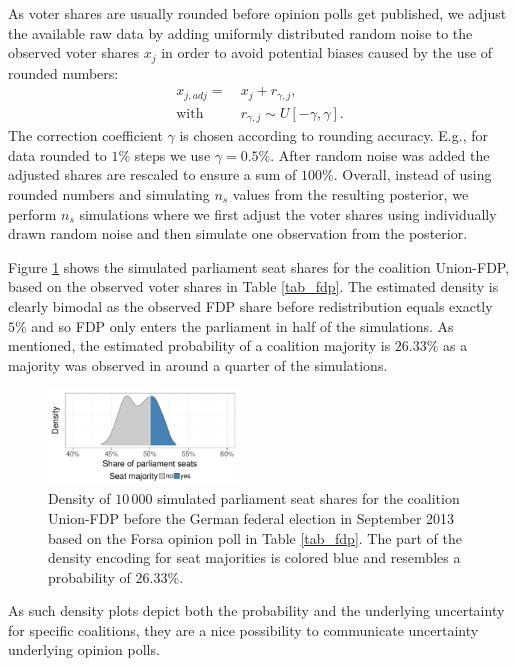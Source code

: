 \documentclass[smallcondensed]{svjour3}     %
\begin{document}
As voter shares are usually rounded before opinion polls get published,
we adjust the available raw data
by adding uniformly distributed random noise to the
observed voter shares $x_j$ in order to avoid potential biases caused 
by the use of rounded numbers:
\begin{equation}
\begin{aligned}
x_{j,adj} = \ &x_j + r_{\gamma,j}, \\
\text{with} \ \ \ \ \ &r_{\gamma,j} \sim U[-\gamma,\gamma].
\end{aligned}
\end{equation}
The correction coefficient $\gamma$ is chosen according to
rounding accuracy.
E.g., for data rounded to $1\%$ steps we use $\gamma = 0.5\%$.
After random noise was added the adjusted shares are rescaled to
ensure a sum of $100\%$. Overall, instead of using rounded numbers
and simulating $n_s$ values from the resulting posterior, we perform 
$n_s$ simulations where
we first adjust the voter shares using individually drawn random noise
and then simulate one observation from the posterior.


Figure \ref{fig:seatDist} shows the simulated
parliament seat shares for the coalition Union-FDP, based on the observed
voter shares in Table \ref{tab_fdp}. The estimated density is clearly bimodal
as the observed FDP share before redistribution equals exactly $5\%$ and
so FDP only enters the parliament in half of the simulations. As mentioned,
the estimated probability of a coalition majority is $26.33\%$ as
a majority was observed in around a quarter of the simulations.

\begin{figure}[H]\centering
\includegraphics[width=0.45\textwidth]{figures/2013_forsa_cdufdp_lastPreelectionPoll.pdf}
\caption{Density of $10\,000$ simulated parliament seat shares for the coalition Union-FDP before the German federal election in September 2013 based on the Forsa opinion poll in Table \ref{tab_fdp}. The part of the density encoding for seat majorities is colored blue and resembles a probability of $26.33\%$.
\label{fig:seatDist}
}
\end{figure}

As such density plots depict both the probability and the underlying
uncertainty for specific coalitions, they are a nice possibility to communicate
uncertainty underlying opinion polls.
\end{document}

